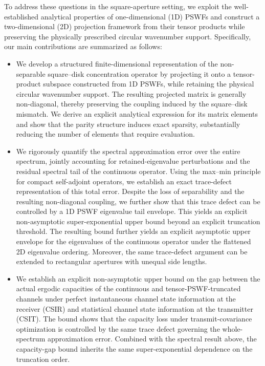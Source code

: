 \documentclass[lettersize,journal]{IEEEtran}
\theoremstyle{plain}
\begin{document}
To address these questions in the square-aperture setting, we exploit the well-established analytical properties of one-dimensional (1D) PSWFs and construct a two-dimensional (2D) projection framework from their tensor products while preserving the physically prescribed circular wavenumber support. Specifically, our main contributions are summarized as follows:
\begin{itemize}
	\item
	We develop a structured finite-dimensional representation of the non-separable square--disk concentration operator by projecting it onto a tensor-product subspace constructed from 1D PSWFs, while retaining the physical circular wavenumber support. The resulting projected matrix is generally non-diagonal, thereby preserving the coupling induced by the square--disk mismatch. We derive an explicit analytical expression for its matrix elements and show that the parity structure induces exact sparsity, substantially reducing the number of elements that require evaluation.
	
	\item
	We rigorously quantify the spectral approximation error over the entire spectrum, jointly accounting for retained-eigenvalue perturbations and the residual spectral tail of the continuous operator. Using the max--min principle for compact self-adjoint operators, we establish an exact trace-defect representation of this total error. Despite the loss of separability and the resulting non-diagonal coupling, we further show that this trace defect can be controlled by a 1D PSWF eigenvalue tail envelope. This yields an explicit non-asymptotic super-exponential upper bound beyond an explicit truncation threshold. The resulting bound further yields an explicit asymptotic upper envelope for the eigenvalues of the continuous operator under the flattened 2D eigenvalue ordering. Moreover, the same trace-defect argument can be extended to rectangular apertures with unequal side lengths.
	
	\item
	We establish an explicit non-asymptotic upper bound on the gap between the actual ergodic capacities of the continuous and tensor-PSWF-truncated channels under perfect instantaneous channel state information at the receiver (CSIR) and statistical channel state information at the transmitter (CSIT). The bound shows that the capacity loss under transmit-covariance optimization is controlled by the same trace defect governing the whole-spectrum approximation error. Combined with the spectral result above, the capacity-gap bound inherits the same super-exponential dependence on the truncation order.
 

\end{itemize}
\end{document}
